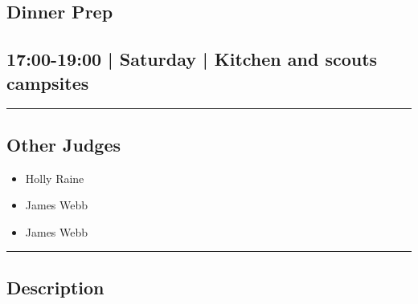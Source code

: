 \documentclass[10pt, A5]{article}
\begin{document}
		\begin{framed}
			\begin{minipage}{\textwidth}

			\setcounter{section}{62}
							\section{Dinner Prep}
						
			\subsection*{17:00-19:00 | Saturday | Kitchen and scouts campsites}

			\vspace{0.25cm}
			\hrule
			\vspace{0.25cm}


			\subsection*{Other Judges}
							

				\begin{multicols}{2}

			\begin{itemize}
											\item Holly Raine
											\item James Webb
								\end{itemize}

			\vfill\null
			\columnbreak

			\begin{itemize}
											\item James Webb
								\end{itemize}

			\vfill\null

			\end{multicols}

			\vspace{0.25cm}
			\hrule
			\vspace{0.25cm}

			\begin{minipage}{\textwidth}
			\subsection*{\faListAlt \: Description}
			
			\end{minipage}


	\end{minipage}
	\end{framed}
\end{document}
